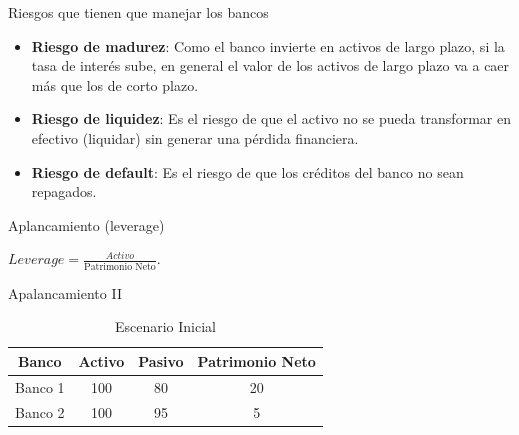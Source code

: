 \documentclass{beamer}
\begin{document}
\begin{frame}{Riesgos que tienen que manejar los bancos}

\begin{itemize}
    \item \textbf{Riesgo de madurez}: Como el banco invierte en activos de largo plazo, si la tasa de interés sube, en general el valor de los activos de largo plazo va a caer más que los de corto plazo. 
    \item \textbf{Riesgo de liquidez}: Es el riesgo de que el activo no se pueda transformar en efectivo (liquidar) sin generar una pérdida financiera. 
    \item \textbf{Riesgo de default}: Es el riesgo de que los créditos del banco no sean repagados.
\end{itemize}
    




\end{frame}


\begin{frame}{Aplancamiento (leverage)}
    \begin{center}
       $ Leverage = \frac{Activo}{\text{Patrimonio Neto}}. $
    \end{center} 
    


    
    
\end{frame}

\begin{frame}{Apalancamiento II}
    \begin{table}[H]
    \centering

    \begin{tabular}{|c|c|c|c|}
    \hline
\textbf{Banco}    & \textbf{Activo} & \textbf{Pasivo} & \textbf{Patrimonio Neto}\\
         \hline \hline
         Banco 1 &  100 &  80 & 20\\[1mm]
        \hline
       Banco 2 & 100  &  95& 5\\[1mm]
        \hline
    \end{tabular}
    \caption{Escenario Inicial}
    \label{inicial}
\end{table}

\end{frame}
\end{document}
